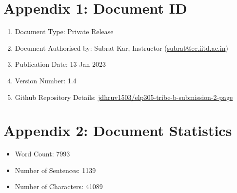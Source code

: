 \documentclass[12pt]{article} %
\begin{document}
\clearpage

\section*{}
\printglossary

\clearpage

\printindex
\clearpage

\begin{appendices}
\section{Appendix 1: Document ID}
   \begin{enumerate}
       \item Document Type: Private Release 
       \item Document Authorised by: Subrat Kar, Instructor (\href{mailto:subrat@ee.iitd.ac.in}{subrat@ee.iitd.ac.in})
       \item Publication Date: 13 Jan 2023
       \item Version Number: 1.4
       \item Github Repository Details: \href{https://github.com/jdhruv1503/elp305-tribe-b-submission-2-page}{jdhruv1503/elp305-tribe-b-submission-2-page}
   \end{enumerate}

\section{Appendix 2: Document Statistics}
    \begin{itemize}
       \item Word Count: 7993
       \item Number of Sentences: 1139
       \item Number of Characters: 41089
    \end{itemize}
    

\end{appendices}
\end{document}
